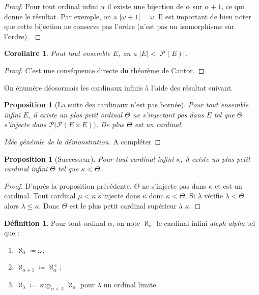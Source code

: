 \documentclass{article}
\theoremstyle{definition}
\newtheorem{definition}[subsubsection]{Définition}
\theoremstyle{plain}
\newtheorem{proposition}[subsubsection]{Proposition}
\theoremstyle{plain}
\newtheorem{corollary}[subsubsection]{Corollaire}
\theoremstyle{plain}
\theoremstyle{plain}
\theoremstyle{plain}
\begin{document}
\begin{proof}
	Pour tout ordinal infini \( \alpha \) il existe une bijection de \( \alpha \) sur \( \alpha + 1 \), ce qui donne le résultat. Par exemple, on a \( |\omega + 1| = \omega \). Il est important de bien noter que cette bijection ne conserve pas l'ordre (n'est pas un isomorphisme sur l'ordre). \cite{gowers2010ordinals}
\end{proof}

\begin{corollary}
	Pout tout ensemble \( E \), on a \( |E| < |\mathcal{P}(E)| \).
\end{corollary}
\begin{proof}
	C'est une conséquence directe du théorème de Cantor.
\end{proof}
\par On énumère déosormais les cardinaux infinis à l'aide des résultat suivant.

\begin{proposition}[La suite des cardinaux n'est pas bornée]
	Pour tout ensemble infini \( E \), il existe un plus petit ordinal \( \Theta \) ne s'injectant pas dans \( E \) tel que \( \Theta \) s'injecte dans \( \mathcal{P(\mathcal{P}}(E \times E))\). De plus \( \Theta \) est un cardinal.
\end{proposition}
\begin{proof}[Idée générale de la démonstration]
	A compléter
\end{proof}

\begin{proposition}[Successeur]
	Pour tout cardinal infini \( \kappa \), il existe un plus petit cardinal infini \( \Theta \) tel que \( \kappa < \Theta \).
\end{proposition}
\begin{proof}
	D'après la proposition précédente, \( \Theta \) ne s'injecte pas dans \( \kappa \) et est un cardinal. Tout cardinal \( \mu < \kappa \) s'injecte dans \( \kappa \) donc \( \kappa < \Theta \). Si \( \lambda \) vérifie \( \lambda <  \Theta \) alors \( \lambda \le \kappa \). Donc \( \Theta \) est le plus petit cardinal supérieur à \( \kappa \).  
\end{proof}

\clearpage

\begin{definition}
Pour tout ordinal \( \alpha \), on note \( \aleph_{\alpha} \) le cardinal infini \textit{aleph alpha} tel que :
	\begin{enumerate}[label = (\roman*) ]
		\item \( \aleph_{0} \coloneqq \omega \);
		\item \( \aleph_{\alpha + 1} \coloneqq \aleph_{\alpha}^{+} \);
		\item \( \aleph_{\lambda} \coloneqq \sup_{\alpha < \lambda} \aleph_{\alpha} \) pour \( \lambda \) un ordinal limite.
	\end{enumerate}
\end{definition}
\end{document}
